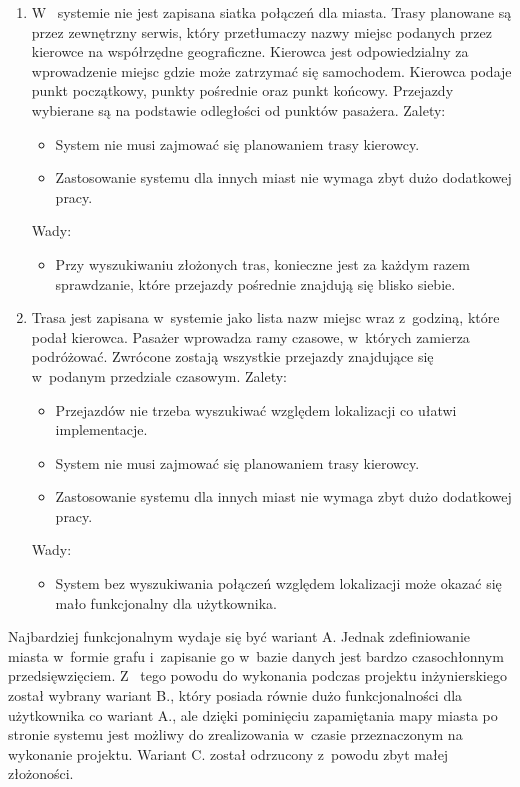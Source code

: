 \documentclass[eng,archivemode]{mgr}
\begin{document}
\begin{enumerate}[label=\textbf{Wariant \Alph*.}]
	\item W~ systemie nie jest zapisana siatka połączeń dla miasta. Trasy planowane są przez zewnętrzny serwis, który przetłumaczy nazwy miejsc podanych przez kierowce na współrzędne geograficzne. Kierowca jest odpowiedzialny za wprowadzenie miejsc gdzie może zatrzymać się samochodem. Kierowca podaje punkt początkowy, punkty pośrednie oraz punkt końcowy. Przejazdy wybierane są na podstawie odległości od punktów pasażera.\newline\newline
	Zalety:
	\begin{itemize}
		\item System nie musi zajmować się planowaniem trasy kierowcy.
		\item Zastosowanie systemu dla innych miast nie wymaga zbyt dużo dodatkowej pracy.
	\end{itemize}
	Wady:
	\begin{itemize}
		\item Przy wyszukiwaniu złożonych tras, konieczne jest za każdym razem sprawdzanie, które przejazdy pośrednie znajdują się blisko siebie.
	\end{itemize}
	\item Trasa jest zapisana w~systemie jako lista nazw miejsc wraz z~godziną, które podał kierowca. Pasażer wprowadza ramy czasowe, w~których zamierza podróżować. Zwrócone zostają wszystkie przejazdy znajdujące się w~podanym przedziale czasowym.\newline\newline
	Zalety:
	\begin{itemize}
		\item Przejazdów nie trzeba wyszukiwać względem lokalizacji co ułatwi implementacje.
		\item System nie musi zajmować się planowaniem trasy kierowcy.
		\item Zastosowanie systemu dla innych miast nie wymaga zbyt dużo dodatkowej pracy.
	\end{itemize}
	Wady:
	\begin{itemize}
		\item System bez wyszukiwania połączeń względem lokalizacji może okazać się mało funkcjonalny dla użytkownika.
	\end{itemize}
\end{enumerate}

Najbardziej funkcjonalnym wydaje się być wariant A. Jednak zdefiniowanie miasta w~formie grafu i~zapisanie go w~bazie danych jest bardzo czasochłonnym przedsięwzięciem. Z~ tego powodu do wykonania podczas projektu inżynierskiego został wybrany wariant B., który posiada równie dużo funkcjonalności dla użytkownika co wariant A., ale dzięki pominięciu zapamiętania mapy miasta po stronie systemu jest możliwy do zrealizowania w~czasie przeznaczonym na wykonanie projektu. Wariant C. został odrzucony z~powodu zbyt małej złożoności.
\end{document}

